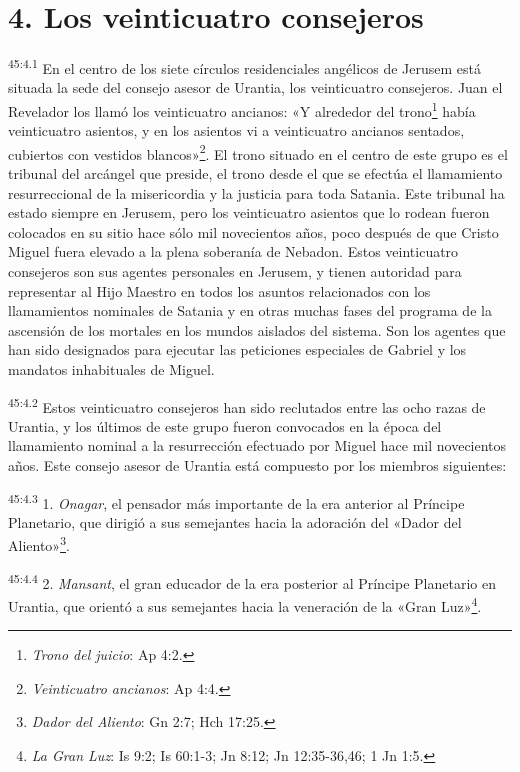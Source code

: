 \section*{4. Los veinticuatro consejeros}
\par
\textsuperscript{45:4.1} En el centro de los siete círculos residenciales angélicos de Jerusem está situada la sede del consejo asesor de Urantia, los veinticuatro consejeros. Juan el Revelador los llamó los veinticuatro ancianos: «Y alrededor del trono\footnote{\textit{Trono del juicio}: Ap 4:2.} había veinticuatro asientos, y en los asientos vi a veinticuatro ancianos sentados, cubiertos con vestidos blancos»\footnote{\textit{Veinticuatro ancianos}: Ap 4:4.}. El trono situado en el centro de este grupo es el tribunal del arcángel que preside, el trono desde el que se efectúa el llamamiento resurreccional de la misericordia y la justicia para toda Satania. Este tribunal ha estado siempre en Jerusem, pero los veinticuatro asientos que lo rodean fueron colocados en su sitio hace sólo mil novecientos años, poco después de que Cristo Miguel fuera elevado a la plena soberanía de Nebadon. Estos veinticuatro consejeros son sus agentes personales en Jerusem, y tienen autoridad para representar al Hijo Maestro en todos los asuntos relacionados con los llamamientos nominales de Satania y en otras muchas fases del programa de la ascensión de los mortales en los mundos aislados del sistema. Son los agentes que han sido designados para ejecutar las peticiones especiales de Gabriel y los mandatos inhabituales de Miguel.

\par
\textsuperscript{45:4.2} Estos veinticuatro consejeros han sido reclutados entre las ocho razas de Urantia, y los últimos de este grupo fueron convocados en la época del llamamiento nominal a la resurrección efectuado por Miguel hace mil novecientos años. Este consejo asesor de Urantia está compuesto por los miembros siguientes:

\par
\textsuperscript{45:4.3} 1. \textit{Onagar}, el pensador más importante de la era anterior al Príncipe Planetario, que dirigió a sus semejantes hacia la adoración del «Dador del Aliento»\footnote{\textit{Dador del Aliento}: Gn 2:7; Hch 17:25.}.

\par
\textsuperscript{45:4.4} 2. \textit{Mansant}, el gran educador de la era posterior al Príncipe Planetario en Urantia, que orientó a sus semejantes hacia la veneración de la «Gran Luz»\footnote{\textit{La Gran Luz}: Is 9:2; Is 60:1-3; Jn 8:12; Jn 12:35-36,46; 1 Jn 1:5.}.

